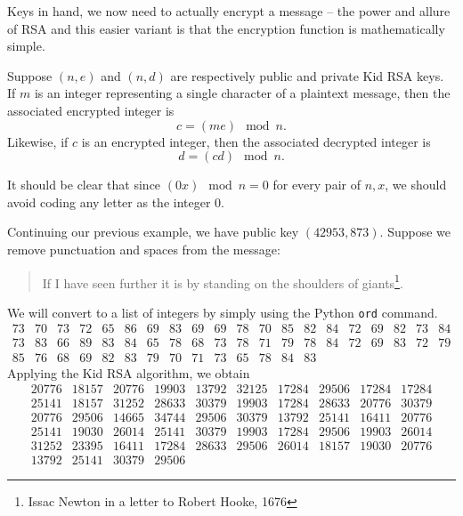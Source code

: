 \documentclass[m3380-lec-main.tex]{subfiles}
\begin{document}
Keys in hand, we now need to actually encrypt a message -- the power and allure of RSA and this easier variant is that the encryption function is mathematically simple. 

\begin{alg}
Suppose $(n,e)$ and $(n,d)$ are respectively public and private Kid RSA keys. If $m$ is an integer representing a single character of a plaintext message, then the associated encrypted integer is 
\[ c = (me)\mod n. \]
Likewise, if $c$ is an encrypted integer, then the associated decrypted integer is 
\[ d= (cd)\mod n.\]
\end{alg}
It should be clear that since $(0x)\mod n=0$ for every pair of $n,x$, we should avoid coding any letter as the integer 0.

\begin{exmp} Continuing our previous example, we have public key $(42953, 873)$. Suppose we remove punctuation and spaces from the message:
\begin{quote}
If I have seen further it is by standing on the shoulders of giants\footnote{Issac Newton in a letter to Robert Hooke, 1676}.
\end{quote}
We will convert to a list of integers by simply using the Python \verb|ord| command.
{\fn\[\begin{array}{rrrrrrrrrrrrrrrrrrrr}
73 & 70 & 73 & 72 & 65 & 86 & 69 & 83 & 69 & 69 & 78 & 70 & 85 & 82 & 84 & 72 & 69 & 82 & 73 & 84 \\
73 & 83 & 66 & 89 & 83 & 84 & 65 & 78 & 68 & 73 & 78 & 71 & 79 & 78 & 84 & 72 & 69 & 83 & 72 & 79 \\
85 & 76 & 68 & 69 & 82 & 83 & 79 & 70 & 71 & 73 & 65 & 78 & 84 & 83 
\end{array}\]}
Applying the Kid RSA algorithm, we obtain 
{\fn\[\begin{array}{rrrrrrrrrr}
20776 & 18157 & 20776 & 19903 & 13792 & 32125 & 17284 & 29506 & 17284 & 17284 \\
25141 & 18157 & 31252 & 28633 & 30379 & 19903 & 17284 & 28633 & 20776 & 30379 \\
20776 & 29506 & 14665 & 34744 & 29506 & 30379 & 13792 & 25141 & 16411 & 20776 \\
25141 & 19030 & 26014 & 25141 & 30379 & 19903 & 17284 & 29506 & 19903 & 26014 \\
31252 & 23395 & 16411 & 17284 & 28633 & 29506 & 26014 & 18157 & 19030 & 20776 \\
13792 & 25141 & 30379 & 29506 
\end{array}\]}
\end{exmp}
\end{document}
